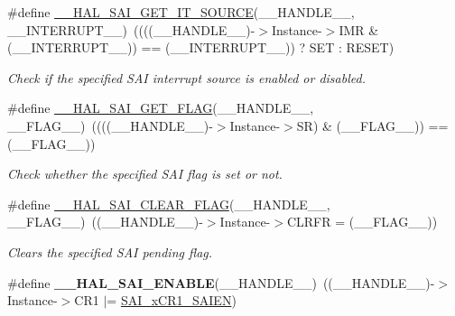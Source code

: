 \begin{DoxyCompactItemize}
\item 
\#define \hyperlink{group___s_a_i___exported___macros_ga0afa781d3932905dd3916078a99abd48}{\+\_\+\+\_\+\+H\+A\+L\+\_\+\+S\+A\+I\+\_\+\+G\+E\+T\+\_\+\+I\+T\+\_\+\+S\+O\+U\+R\+CE}(\+\_\+\+\_\+\+H\+A\+N\+D\+L\+E\+\_\+\+\_\+,  \+\_\+\+\_\+\+I\+N\+T\+E\+R\+R\+U\+P\+T\+\_\+\+\_\+)~((((\+\_\+\+\_\+\+H\+A\+N\+D\+L\+E\+\_\+\+\_\+)-\/$>$Instance-\/$>$I\+MR \& (\+\_\+\+\_\+\+I\+N\+T\+E\+R\+R\+U\+P\+T\+\_\+\+\_\+)) == (\+\_\+\+\_\+\+I\+N\+T\+E\+R\+R\+U\+P\+T\+\_\+\+\_\+)) ? S\+ET \+: R\+E\+S\+ET)
\begin{DoxyCompactList}\small\item\em Check if the specified S\+AI interrupt source is enabled or disabled. \end{DoxyCompactList}\item 
\#define \hyperlink{group___s_a_i___exported___macros_ga47950261a8f24947541c014189eb34d8}{\+\_\+\+\_\+\+H\+A\+L\+\_\+\+S\+A\+I\+\_\+\+G\+E\+T\+\_\+\+F\+L\+AG}(\+\_\+\+\_\+\+H\+A\+N\+D\+L\+E\+\_\+\+\_\+,  \+\_\+\+\_\+\+F\+L\+A\+G\+\_\+\+\_\+)~((((\+\_\+\+\_\+\+H\+A\+N\+D\+L\+E\+\_\+\+\_\+)-\/$>$Instance-\/$>$SR) \& (\+\_\+\+\_\+\+F\+L\+A\+G\+\_\+\+\_\+)) == (\+\_\+\+\_\+\+F\+L\+A\+G\+\_\+\+\_\+))
\begin{DoxyCompactList}\small\item\em Check whether the specified S\+AI flag is set or not. \end{DoxyCompactList}\item 
\#define \hyperlink{group___s_a_i___exported___macros_ga6ddbe8cd04c21fa5b97346cbcd91ccae}{\+\_\+\+\_\+\+H\+A\+L\+\_\+\+S\+A\+I\+\_\+\+C\+L\+E\+A\+R\+\_\+\+F\+L\+AG}(\+\_\+\+\_\+\+H\+A\+N\+D\+L\+E\+\_\+\+\_\+,  \+\_\+\+\_\+\+F\+L\+A\+G\+\_\+\+\_\+)~((\+\_\+\+\_\+\+H\+A\+N\+D\+L\+E\+\_\+\+\_\+)-\/$>$Instance-\/$>$C\+L\+R\+FR = (\+\_\+\+\_\+\+F\+L\+A\+G\+\_\+\+\_\+))
\begin{DoxyCompactList}\small\item\em Clears the specified S\+AI pending flag. \end{DoxyCompactList}\item 
\#define {\bfseries \+\_\+\+\_\+\+H\+A\+L\+\_\+\+S\+A\+I\+\_\+\+E\+N\+A\+B\+LE}(\+\_\+\+\_\+\+H\+A\+N\+D\+L\+E\+\_\+\+\_\+)~((\+\_\+\+\_\+\+H\+A\+N\+D\+L\+E\+\_\+\+\_\+)-\/$>$Instance-\/$>$C\+R1 $\vert$=  \hyperlink{group___peripheral___registers___bits___definition_ga7916f81ebe07b5109b0ca405d41eb95b}{S\+A\+I\+\_\+x\+C\+R1\+\_\+\+S\+A\+I\+EN})\hypertarget{group___s_a_i___exported___macros_ga8568947265caaaa934bdf78ce781049f}{}\label{group___s_a_i___exported___macros_ga8568947265caaaa934bdf78ce781049f}


\end{DoxyCompactItemize}
